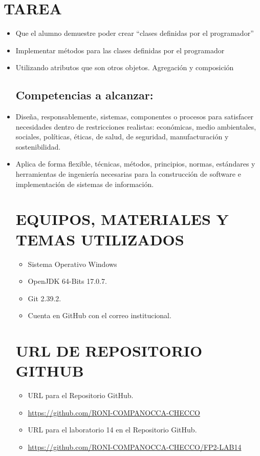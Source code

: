 \documentclass{article}
\begin{document}
    \section{TAREA}
	\begin{itemize}	
    \subsection{Objetivos:}
		\item Que el alumno demuestre poder crear “clases definidas por el programador” 
		\item Implementar métodos para las clases definidas por el programador
        \item Utilizando atributos que son otros objetos. Agregación y composición
       
    \subsection{Competencias a alcanzar:}
		\item Diseña, responsablemente, sistemas, componentes o procesos para satisfacer necesidades dentro de restricciones realistas: económicas, medio ambientales, sociales, políticas, éticas, de salud, de seguridad, manufacturación y sostenibilidad. 
        \item Aplica de forma flexible, técnicas, métodos, principios, normas, estándares y herramientas de ingeniería necesarias para la construcción de software e implementación de sistemas de información.

    \section{EQUIPOS, MATERIALES Y TEMAS UTILIZADOS}
	\begin{itemize}
		\item Sistema Operativo Windows
		\item OpenJDK 64-Bits 17.0.7.
		\item Git 2.39.2.	
  	\item Cuenta en GitHub con el correo institucional.
	\end{itemize}

    \section{URL DE REPOSITORIO GITHUB}
	\begin{itemize}
		\item URL para el Repositorio GitHub.
		\item \url{https://github.com/RONI-COMPANOCCA-CHECCO}
		\item URL para el laboratorio 14 en el Repositorio GitHub.	
        \item \url{https://github.com/RONI-COMPANOCCA-CHECCO/FP2-LAB14}
	\end{itemize}


\end{itemize}
\end{document}
